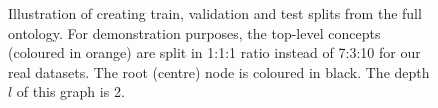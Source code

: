 \begin{figure}[t]
    \caption{Illustration of creating train, validation and test splits from the full ontology. For demonstration purposes, the top-level concepts (coloured in orange) are split in 1:1:1 ratio instead of 7:3:10 for our real datasets. The root (centre) node is coloured in black. The depth $l$ of this graph is 2.}
    \label{fig:train-test-split}
\end{figure}
